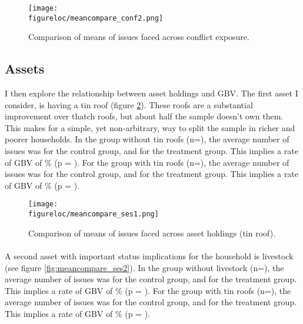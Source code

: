 \documentclass[11pt,a4paper]{scrartcl} %
\newcommand{\figureloc}{C:/Users/Koen/Dropbox/PhD/Papers/CongoGBV/Figures}
\begin{document}
\begin{figure}[H]
  \texttt{[image: \\figureloc/meancompare\_conf2.png]}
  \caption{Comparison of means of issues faced across conflict exposure.}
  \label{fig:meancompare_conf2}
\end{figure}

\subsection*{Assets}
I then explore the relationship between asset holdings and GBV. The first asset I consider, is having a tin roof (figure \ref{fig:meancompare_ses1}). These roofs are a substantial improvement over thatch roofs, but about half the sample doesn't own them. This makes for a simple, yet non-arbitrary, way to split the sample in richer and poorer households.   In the group without tin roofs (n=), the average number of issues was  for the control group, and  for the treatment group. This implies a rate of GBV of \% (p = ). For the group with tin roofs (n=), the average number of issues was  for the control group, and  for the treatment group. This implies a rate of GBV of \% (p = ).

\begin{figure}[H]
  \texttt{[image: \\figureloc/meancompare\_ses1.png]}
  \caption{Comparison of means of issues faced across asset holdings (tin roof).}
  \label{fig:meancompare_ses1}
\end{figure}

\paragraph{}
A second asset with important status implications for the household is livestock (see figure \ref{fig:meancompare_ses2}).  In the group without livestock (n=), the average number of issues was  for the control group, and  for the treatment group. This implies a rate of GBV of \% (p = ). For the group with tin roofs (n=), the average number of issues was  for the control group, and  for the treatment group. This implies a rate of GBV of \% (p = ).
\end{document}
